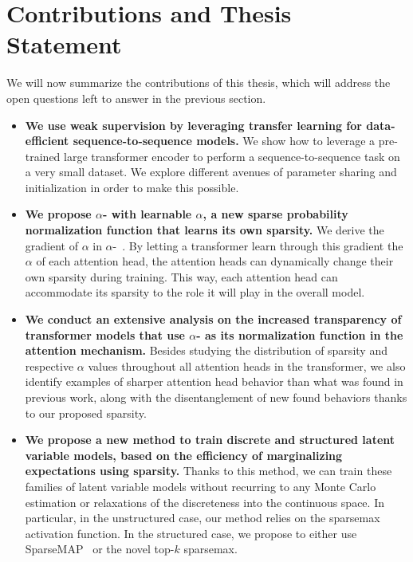\section{Contributions and Thesis Statement}
\label{sec:int_contributions}

We will now summarize the contributions of this thesis, which will
address the open questions left to answer in the previous section.

\begin{itemize}

      \item \textbf{We use weak supervision by leveraging transfer learning
                  for data-efficient sequence-to-sequence models.}
            We show how to leverage a pre-trained large transformer
            encoder to perform a sequence-to-sequence task on a very
            small dataset. We explore different avenues of parameter
            sharing and initialization in order to make this
            possible.


      \item \textbf{We propose {\boldmath $\alpha$}-\entmaxtext{} with
                  learnable {\boldmath $\alpha$}, a new sparse probability
                  normalization function that learns its own sparsity.}
            We derive the gradient of $\alpha$ in
            $\alpha$-\entmaxtext{}~\citep{entmax}. By letting a
            transformer learn through this gradient the $\alpha$ of
            each attention head, the attention heads can dynamically
            change their own sparsity during training. This way, each
            attention head can accommodate its sparsity to the role
            it will play in the overall model.

      \item \textbf{We conduct an extensive analysis on the increased
                  transparency of transformer models that use {\boldmath
                              $\alpha$}-\entmaxtext{} as its normalization function in the
                  attention mechanism.}
            Besides studying the distribution of sparsity and respective $\alpha$ values
            throughout all attention heads in the transformer, we also identify
            examples of sharper attention head behavior than what was found in
            previous work, along with the disentanglement of new found behaviors
            thanks to our proposed sparsity.

      \item \textbf{We propose a new method to train discrete and
                  structured latent variable models, based on the
                  efficiency of marginalizing expectations using
                  sparsity.}
            Thanks to this method, we can train these families of
            latent variable models without recurring to any Monte Carlo
            estimation or relaxations of the discreteness into the
            continuous space. In particular, in the unstructured
            case, our method relies on the sparsemax activation
            function. In the structured case, we propose to either
            use SparseMAP~\citep{niculae2018sparsemap} or the
            novel top-$k$ sparsemax.


\end{itemize}
